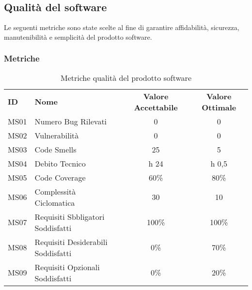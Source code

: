 \subsection{Qualità del software}
Le seguenti metriche sono state scelte al fine di garantire affidabilità, sicurezza, manutenibilità e semplicità del prodotto software.

    \subsubsection{Metriche}
    \begin{table} [h!]
        \begin{center}
            \begin{tabular} {m{2 cm} m{7 cm} c c }
                \rowcolor{lightgray}
                \textbf{ID} & \textbf{Nome}           & \textbf{Valore Accettabile} & \textbf{Valore Ottimale}\\
                MS01        & Numero Bug Rilevati     & 0                           & 0\\
                MS02        & Vulnerabilità           & 0                           & 0\\
                MS03        & Code Smells             & 25                          & 5\\
                MS04        & Debito Tecnico          & h 24                        & h 0,5\\
                MS05        & Code Coverage           & 60\%                        & 80\%\\
                MS06        & Complessità Ciclomatica & 30                          & 10\\
                MS07        & Requisiti Sbbligatori Soddisfatti & 100\%             & 100\%\\
                MS08        & Requisiti Desiderabili Soddisfatti & 0\%              & 70\%\\
                MS09        & Requisiti Opzionali Soddisfatti & 0\%                 & 20\%\\
            \end{tabular}
            \caption{Metriche qualità del prodotto software}
        \end{center}
    \end{table}